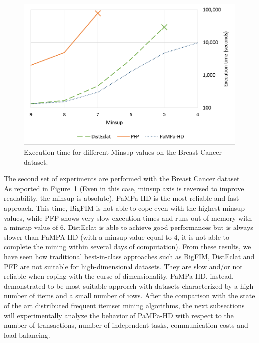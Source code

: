 \begin{figure}[!t]
\includegraphics[width=5in]{chapters/pampa/immagini_extension/breast_confronto.png}
\caption{Execution time for different Minsup values on the Breast Cancer dataset.}
\label{breast_confronto}
\end{figure}
The second set of experiments are performed with the Breast
Cancer dataset~\cite{breast_cancer_dataset}.
As reported in Figure~\ref{breast_confronto} (Even in this case, minsup axis is reversed to improve readability, the minsup is absolute), PaMPa-HD is the most reliable and fast approach.
This time, BigFIM is not able to cope even with the highest minsup values, while PFP shows very slow execution times and runs out of memory with a minsup value of 6.
DistEclat is able to achieve good performances but is always slower than PaMPA-HD (with a minsup value equal to 4, it is not able to complete the mining within several days of computation).
From these results, we have seen how traditional best-in-class approaches such as BigFIM, DistEclat and PFP are not suitable for high-dimensional datasets. They are slow and/or not reliable when coping with the curse of dimensionality. PaMPa-HD, instead, demonstrated to be most suitable approach with datasets characterized by a high number of items and a small number of rows.
After the comparison with the state of the art distributed frequent itemset mining algorithms, the next subsections will experimentally analyze the behavior of PaMPa-HD with respect to the number of transactions, number of independent tasks, communication costs and load balancing.

